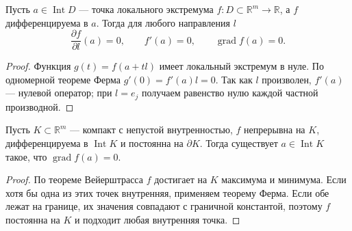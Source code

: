\label{ticket:10}

\begin{theorem}
Пусть $a\in\operatorname{Int}D$ --- точка локального экстремума $f:D\subset\mathbb R^m\to\mathbb R$, а $f$ дифференцируема в $a$.
Тогда для любого направления $l$
\[
  \frac{\partial f}{\partial l}(a)=0,
  \qquad f'(a)=0,
  \qquad\operatorname{grad}f(a)=0.
\]
\end{theorem}

\begin{proof}
Функция $g(t)=f(a+tl)$ имеет локальный экстремум в нуле.
По одномерной теореме Ферма $g'(0)=f'(a)l=0$.
Так как $l$ произволен, $f'(a)$ --- нулевой оператор; при $l=e_j$ получаем равенство нулю каждой частной производной.
\end{proof}

\begin{theorem}[Ролля]
Пусть $K\subset\mathbb R^m$ --- компакт с непустой внутренностью, $f$ непрерывна на $K$, дифференцируема в $\operatorname{Int}K$ и постоянна на $\partial K$.
Тогда существует $a\in\operatorname{Int}K$ такое, что $\operatorname{grad}f(a)=0$.
\end{theorem}

\begin{proof}
По теореме Вейерштрасса $f$ достигает на $K$ максимума и минимума.
Если хотя бы одна из этих точек внутренняя, применяем теорему Ферма.
Если обе лежат на границе, их значения совпадают с граничной константой, поэтому $f$ постоянна на $K$ и подходит любая внутренняя точка.
\end{proof}
